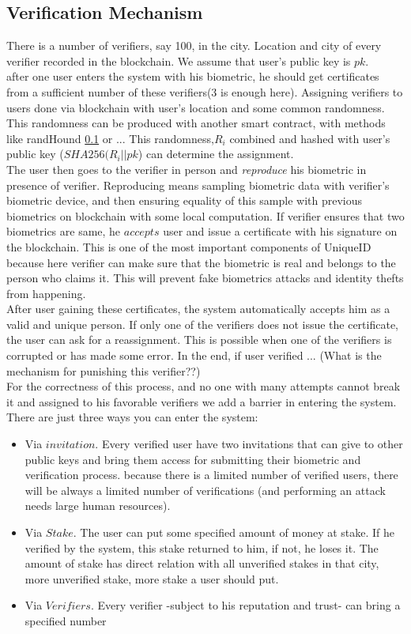 \documentclass[conference]{IEEEtran}
\begin{document}
\subsection{Verification Mechanism}
There is a number of verifiers, say 100, in the city. Location and city of every verifier recorded in the blockchain. We assume that user's public key is $pk$.
\\

 after one user enters the system with his biometric, he should get certificates from a sufficient number of these verifiers(3 is enough here). Assigning verifiers to users done via blockchain with user's location and some common randomness. This randomness can be produced with another smart contract, with methods like randHound \ref{} or ...   This randomness,$ R_i$ combined and hashed with user's public key ($SHA256(R_i || pk$) can determine the assignment. \\ 
The user then goes to the verifier in person and \textit{reproduce}  his biometric in presence of verifier. Reproducing means sampling biometric data with verifier's biometric device, and then ensuring equality of this sample with previous biometrics on blockchain with some local computation. If verifier ensures that two biometrics are same, he $accepts$ user and issue a certificate with his signature on the blockchain. This is one of the most important components of UniqueID because here verifier can make sure that the biometric is real and belongs to the person who claims it. This will prevent fake biometrics attacks and identity thefts from happening.
\\
After user gaining these certificates, the system automatically accepts him as a valid and unique person. If only one of the verifiers does not issue the certificate, the user can ask for a reassignment. This is possible when one of the verifiers is corrupted or has made some error. In the end, if user verified ... (What is the mechanism for punishing this verifier??)
\\
For the correctness of this process, and no one with many attempts cannot break it and assigned to his favorable verifiers we add a barrier in entering the system. There are just three ways you can enter the system:
\begin{itemize}
\item Via $invitation$. Every verified user have two invitations that can give to other public keys and bring them access for submitting their biometric and verification process. because there is a limited number of verified users, there will be always a limited number of verifications (and performing an attack needs large human resources).

\item Via $Stake$. The user can put some specified amount of money at stake. If he verified by the system, this stake returned to him, if not, he loses it. The amount of stake has direct relation with all unverified stakes in that city, more unverified stake, more stake a user should put.

\item Via $Verifiers$. Every verifier -subject to his reputation and trust- can bring a specified number  
\end{itemize}
\end{document}
